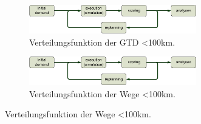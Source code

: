 \begin{figure}
\centering

\caption{Standardisierte Verteilungsfunktionen der Kurzdistanzen (MZ).}
\label{fig:mz-fit}

\begin{subfigure}{0.49\textwidth}
    \centering
    \caption{Verteilungsfunktion der GTD <100km.}
    \label{subfig:mz-fit-met-1}
    \includegraphics[width=0.8\textwidth]{figures/MATSimLoop.pdf}
\end{subfigure}
\begin{subfigure}[]{0.49\textwidth}
    \centering
    \caption{Verteilungsfunktion der Wege <100km.}
    \label{subfig:mz-fit-met-2}
    \includegraphics[width=0.8\textwidth]{figures/MATSimLoop.pdf}
\end{subfigure}


\ivthline
\end{figure}
